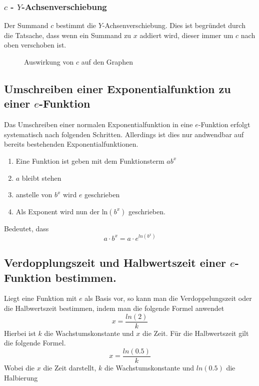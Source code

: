 \pagebreak
\subsubsection{$c$ - $Y$-Achsenverschiebung}\label{sec:e-Funktion/Umformung von der normalen Exponentialfunktion zu der E-Funktion/Normalform/c - Y-Achsenverschiebung}
Der Summand $c$ bestimmt die $Y$-Achsenverschiebung. Dies ist begründet durch die Tatsache, dass wenn ein Summand zu $x$ addiert wird, dieser immer um $c$ nach oben verschoben ist. 
\begin{figure}[h]
\centering
	\caption{Auswirkung von $c$ auf den Graphen}
\end{figure}
\subsection{Umschreiben einer Exponentialfunktion zu einer $e$-Funktion}
Das Umschreiben einer normalen Exponentialfunktion in eine $e$-Funktion erfolgt systematisch nach folgenden Schritten. Allerdings ist dies nur andwendbar auf bereits bestehenden Exponentialfunktionen.
\begin{enumerate}
	\item Eine Funktion ist geben mit dem Funktionsterm $ab^x$
	\item $a$ bleibt stehen
	\item anstelle von $b^x$ wird $e$ geschrieben
	\item Als Exponent wird nun der $\mathrm {ln}(b^x)$ geschrieben. 
\end{enumerate}
Bedeutet, dass \[a\cdot b^x=a\cdot e^{ln(b^x)}\]

\subsection{Verdopplungszeit und Halbwertszeit einer $e$-Funktion bestimmen.}
Liegt eine Funktion mit $e$ als Basis vor, so kann man die Verdoppelungszeit oder die Halbwertszeit bestimmen, indem man die folgende Formel anwendet
\[x=\frac{ln(2)}{k}\]
Hierbei ist $k$ die Wachstumskonstante und $x$ die Zeit. Für die Halbwertszeit gilt die folgende Formel.
\[x=\frac{ln(0.5)}{k}\]
Wobei die $x$ die Zeit darstellt, $k$ die Wachstumskonstante und $ln(0.5)$ die Halbierung


